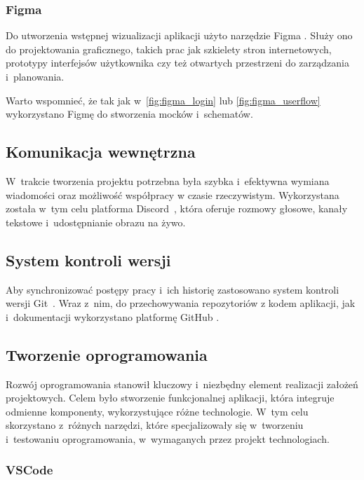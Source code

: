 \subsubsection{Figma}

Do utworzenia wstępnej wizualizacji aplikacji użyto narzędzie Figma \cite{Figma}.
Służy ono do projektowania graficznego, takich prac jak szkielety stron
internetowych, prototypy interfejsów użytkownika czy też otwartych przestrzeni
do zarządzania i~planowania.

Warto wspomnieć, że tak jak w~\ref{fig:figma_login} lub
\ref{fig:figma_userflow} wykorzystano Figmę do stworzenia mocków i~schematów.

\FloatBarrier

\subsection{Komunikacja wewnętrzna}

W~trakcie tworzenia projektu potrzebna była szybka i~efektywna
wymiana wiadomości oraz możliwość współpracy w czasie rzeczywistym.
Wykorzystana została w~tym celu platforma Discord~\cite{Discord},
która oferuje rozmowy głosowe, kanały tekstowe i~udostępnianie
obrazu na żywo.


\subsection{System kontroli wersji}

Aby synchronizować postępy pracy i~ich historię zastosowano
system kontroli wersji Git~\cite{Git}. Wraz z~nim, do przechowywania
repozytoriów z kodem aplikacji, jak i~dokumentacji wykorzystano
platformę GitHub \cite{Github}.


\subsection{Tworzenie oprogramowania}

Rozwój oprogramowania stanowił kluczowy i~niezbędny element realizacji
założeń projektowych.
Celem było stworzenie funkcjonalnej aplikacji, która integruje
odmienne komponenty, wykorzystujące różne technologie.
W~tym celu skorzystano z~różnych narzędzi, które specjalizowały się
w~tworzeniu i~testowaniu oprogramowania, w~wymaganych przez projekt
technologiach.


\subsubsection{VSCode}

